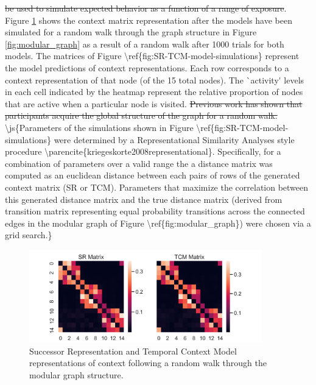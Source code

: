  \st{be used to simulate expected behavior as a function of a range of exposure}. Figure \ref{fig:SR-TCM-model-simulations} shows the context matrix representation after the models have been simulated for a random walk through the graph structure in Figure \ref{fig:modular_graph} as a result of a random walk after 1000 trials for both models. \ac{The matrices of Figure \ref{fig:SR-TCM-model-simulations} represent the model predictions of context representations. Each row corresponds to a context representation of that node (of the 15 total nodes). The `activity' levels in each cell indicated by the heatmap represent the relative proportion of nodes that are active when a particular node is visited.} \st{Previous work has shown that participants acquire the global structure of the graph for a random walk.} \ac{\js{Parameters of the simulations shown in Figure \ref{fig:SR-TCM-model-simulations} were determined by a Representational Similarity Analyses style procedure \parencite{kriegeskorte2008representational}. Specifically, for a combination of parameters over a valid range the a distance matrix was computed as an euclidean distance between each pairs of rows of the generated context matrix (SR or TCM). Parameters that maximize the correlation between this generated distance matrix and the true distance matrix (derived from transition matrix representing equal probability transitions across the connected edges in the modular graph of Figure \ref{fig:modular_graph}) were chosen via a grid search.}} 

\begin{figure}[!ht]
	\centering
	\includegraphics[width = 0.9\textwidth]{chapter_notebooks/chapter_2/figures/SR_vs_TCM_Matrices.png}
	\caption{Successor Representation and Temporal Context Model representations of context following a random walk through the modular graph structure.}
	\label{fig:SR-TCM-model-simulations}
\end{figure}


